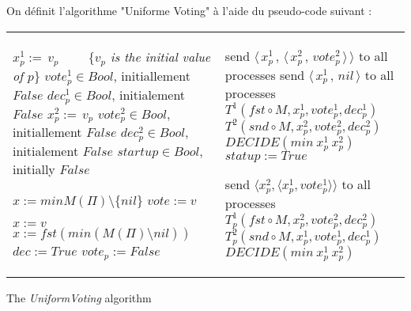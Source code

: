 \documentclass{article}
\begin{document}
On définit l'algorithme "Uniforme Voting" à l'aide du pseudo-code suivant :
\begin{algorithm}[htb]
\scriptsize{
\begin{distribalgo}[1]
\begin{tabular}{ll}
\begin{minipage}{41em}


\INDENT{\textbf{Initialization:}}
	\STATE $x^1_p :=\, v_p$ ~~~~\{\emph{$v_p$ is the initial value of $p$}\}
	\STATE $vote^1_p \in Bool$, initiallement $False$
	\STATE $dec^1_p \in Bool$, initialement $False$
	\BLANK
	\STATE $x^2_p :=\, v_p$
	\STATE $vote^2_p \in Bool$, initiallement $False$
	\STATE $dec^2_p \in Bool$, initialement $False$
	\BLANK
	\STATE $startup \in Bool$, initially $False$

\ENDINDENT
\BLANK

\INDENT{\textbf{Fonctions sur une instance}}
	\INDENT{$T^1_p(M, ref ~ x, ref ~ vote, ref ~ dec):$}
		\STATE $ x := min M(\Pi) \setminus \{nil\}$ 
		\IF{$M(\Pi) = \{v\}$}
		\COMMENT{tous les messages valent $v$, aucun $nil$}
			\STATE $vote := v$
		\ENDIF
	\ENDINDENT
	\BLANK

	\INDENT{$T^2_p(M, ref ~ x, ref ~ vote, ref ~ dec):$}

		\IF{$\exists v \in V, q \in \Pi, M(q) = \langle v, True \rangle$}
			\STATE $x := v$ \COMMENT{au moins un vote reçu}
		\ELSIF{$min(\Pi) \nsubseteq \{nil\}$}
			\STATE $x := fst (min (M(\Pi) \setminus {nil}))$
			\COMMENT{plus petite valeur reçue}
		\ENDIF
		\IF{$M(\Pi) = \{\langle v, True \rangle\}$}
		\COMMENT{tous les messages sont des votes pour $v$}
			\STATE $dec := True$
		\ENDIF
		\STATE $vote_p := False$
	\ENDINDENT
\ENDINDENT

\end{minipage}
&
\begin{minipage}{31em}

\INDENT{\textbf{Round $r=2\phi-1\,$:}}
	\INDENT{$S_p:$}
		\IF{$statup$}
			\STATE send $\langle\, x^1_p\, ,\, \langle \, x^2_p \, ,\, vote^2_p \, \rangle \, \rangle$ to all processes
		\ELSE
			\STATE send $\langle\, x^1_p\, ,\, nil \, \rangle$ to all processes
		\ENDIF
	\ENDINDENT
	\BLANK
	\INDENT{$T_p(M):$}
		\STATE $T^1(fst \circ M, x^1_p, vote^1_p, dec^1_p)$
		\IF{$statup$}
			\STATE $T^2(snd \circ M, x^2_p, vote^2_p, dec^2_p)$
		\ENDIF
		\IF{$dec^1_p \wedge dec^2_p $}
			\STATE $DECIDE(min ~ x^1_p ~ x^2_p)$
		\ENDIF
		\STATE $statup := True$
	\ENDINDENT
\ENDINDENT

\INDENT{\textbf{Round $r=2\phi\,$:}}
	\INDENT{$S_p:$}
		\STATE send $\langle x^2_p , \langle x^1_p, vote^1_p \rangle \rangle$ to all processes
	\ENDINDENT
	\BLANK
	\INDENT{$T_p(M)$}
		\STATE $T^1_p(fst \circ M, x_p^2, vote^2_p, dec^2_p)$
		\STATE $T^2_p(snd \circ M, x_p^1, vote^1_p, dec^1_p)$
		\IF{$dec^1_p \wedge dec^2_p $}
			\STATE $DECIDE(min ~ x^1_p ~ x^2_p)$
		\ENDIF
		\STATE
	\ENDINDENT
\ENDINDENT

\end{minipage}
\end{tabular}

\caption{The {\em UniformVoting} algorithm}
\label{unifvotfig}
\end{distribalgo}
}
\end{algorithm}
\end{document}
